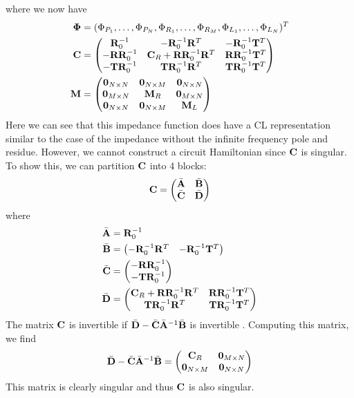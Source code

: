where we now have
\begin{align}
    \vb{\Phi} &= (\Phi_{P_1},\dots,\Phi_{P_N},\Phi_{R_1},\dots,\Phi_{R_M},\Phi_{L_1},\dots,\Phi_{L_N})^T\\
    \vb{C} &= \mqty(
        \vb{R}_0^{-1} & -\vb{R}_0^{-1}\vb{R}^T & -\vb{R}_0^{-1}\vb{T}^T \\
        -\vb{R}\vb{R}_0^{-1} & \vb{C}_R + \vb{R}\vb{R}_0^{-1}\vb{R}^T & \vb{R}\vb{R}_0^{-1}\vb{T}^T \\
        -\vb{T}\vb{R}_0^{-1} & \vb{T}\vb{R}_0^{-1}\vb{R}^T & \vb{T}\vb{R}_0^{-1}\vb{T}^T
    ) \\
    \vb{M} &= \mqty(
        \vb{0}_{N \times N} & \vb{0}_{N \times M} & \vb{0}_{N \times N} \\
        \vb{0}_{M \times N} & \vb{M}_R & \vb{0}_{M \times N} \\
        \vb{0}_{N \times N} & \vb{0}_{N \times M} & \vb{M}_L
    )
\end{align}
Here we can see that this impedance function does have a CL representation similar to the case of the impedance without the infinite frequency pole and residue. However, we cannot construct a circuit Hamiltonian since $\vb{C}$ is singular. To show this, we can partition $\vb{C}$ into 4 blocks:
\begin{equation}
    \vb{C} = \mqty( \bar{\vb{A}} & \bar{\vb{B}} \\ \bar{\vb{C}} & \bar{\vb{D}})
\end{equation}
where
\begin{align}
    \bar{\vb{A}} &= \vb{R}_0^{-1} \\
    \bar{\vb{B}} &= \mqty( -\vb{R}_0^{-1}\vb{R}^T & -\vb{R}_0^{-1}\vb{T}^T ) \\ 
    \bar{\vb{C}} &= \mqty( -\vb{R}\vb{R}_0^{-1} \\ -\vb{T}\vb{R}_0^{-1} ) \\
    \bar{\vb{D}} &= \mqty(  \vb{C}_R + \vb{R}\vb{R}_0^{-1}\vb{R}^T & \vb{R}\vb{R}_0^{-1}\vb{T}^T \\
    \vb{T}\vb{R}_0^{-1}\vb{R}^T & \vb{T}\vb{R}_0^{-1}\vb{T}^T )
\end{align}
The matrix $\vb{C}$ is invertible if $\bar{\vb{D}} - \bar{\vb{C}}\bar{\vb{A}}^{-1}\bar{\vb{B}}$ is invertible \cite[Proposition 2.8.7]{matrix_mathematics}. Computing this matrix, we find
\begin{equation}
    \bar{\vb{D}} - \bar{\vb{C}}\bar{\vb{A}}^{-1}\bar{\vb{B}} = \mqty( \vb{C}_R & \vb{0}_{M \times N} \\  \vb{0}_{N \times M} & \vb{0}_{N \times N})
\end{equation} 
This matrix is clearly singular and thus $\vb{C}$ is also singular. 

